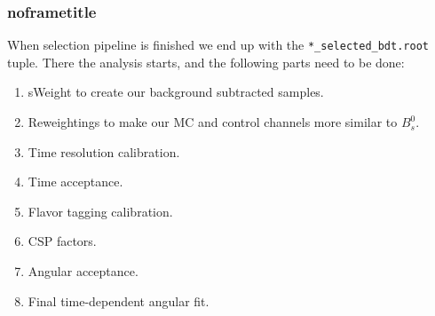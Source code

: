 \documentclass[9pt,aspectratio=43]{beamer}
\begin{document}
%
\begin{frame}[default]
\frametitle{noframetitle}

When selection pipeline is finished we end up with the \texttt{*\_selected\_bdt.root} tuple.
There the analysis starts, and the following parts need to be done:

\begin{enumerate}
  \item sWeight to create our background subtracted samples.
  \item Reweightings to make our MC and control channels more similar to $B_s^0$.
  \item Time resolution calibration.
  \item Time acceptance.
  \item Flavor tagging calibration.
  \item CSP factors.
  \item Angular acceptance.
  \item Final time-dependent angular fit.
\end{enumerate}

\end{frame}
%
\end{document}
